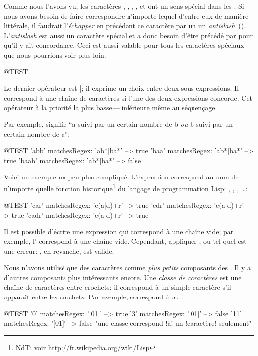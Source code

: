 \documentclass[a4paper,10pt,twoside]{book}
\begin{document}
Comme nous l'avons vu, les caractères \ct{*}, \ct{+}, , \ct{(},
et \ct{)} ont un sens spécial dans les \expregs. Si nous avons besoin
de faire correspondre n'importe lequel d'entre eux de manière
littérale, il faudrait l'\emph{échapper} en précédant ce caractère par
un \escchar \cad un \mbox{\emph{antislash} ().} L'\emph{antislash} est
  aussi un caractère spécial et a donc besoin d'être précédé par
  \escchar pour qu'il y ait concordance. Ceci est aussi valable pour
  tous les caractères spéciaux que nous pourrions voir plus loin.
\begin{code}{@TEST}




Le dernier op\'erateur est \textsf{|}; il exprime un choix entre deux sous-expressions. Il correspond \`a une cha\^ine de caract\`eres si l'une des deux expressions concorde. Cet op\'erateur \`a la priorit\'e la plus basse\,---\,inf\'erieure m\^eme au s\'equen\c cage.


Par exemple,  signifie ``a suivi par un certain nombre de
b \emph{ou} b suivi par un certain nombre de a'':
\begin{code}{@TEST}
'abb' matchesRegex: 'ab*|ba*'   --> true
'baa' matchesRegex: 'ab*|ba*'	--> true
'baab' matchesRegex: 'ab*|ba*' --> false
\end{code}

Voici un exemple un peu plus compliqué. L'expression 
correspond au nom de n'importe quelle fonction
historique\footnote{NdT: voir \url{http://fr.wikipedia.org/wiki/Lisp}} du langage de programmation Lisp: 
 , , , \ldots:
\begin{code}{@TEST}
'car' matchesRegex: 'c(a|d)+r'   --> true
'cdr' matchesRegex: 'c(a|d)+r'   --> true
'cadr' matchesRegex: 'c(a|d)+r' --> true
\end{code} %

Il est possible d'écrire une expression qui correspond à une chaîne
vide; par exemple, l'\expreg {} correspond à une chaîne vide.
Cependant, appliquer  \ct{*}, \ct{+} ou  tel quel est une
erreur: , en revanche, est valide.

Nous n'avons utilisé que des caractères comme \emph{plus petits}
composants des \expregs.
Il y a d'autres composants plus intéressants encore. Une \emph{classe
de caractères} est une chaîne de caractères entre crochets: il
correspond à un simple caractère s'il apparaît entre les crochets. Par
exemple, \ct{[01]} correspond à  ou :
\begin{code}{@TEST}
'0' matchesRegex: '[01]'   --> true
'3' matchesRegex: '[01]'   --> false
'11' matchesRegex: '[01]' --> false  "une classe correspond !à! un !caractère! seulement"
\end{code}


\end{code}
\end{document}
